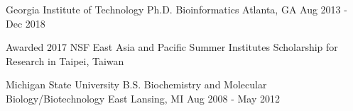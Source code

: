 \vspace{1.0mm}

\begin{cventries}

  \cventry
  	{Georgia Institute of Technology} %
    {Ph.D. Bioinformatics \scriptsize{}}%
    {Atlanta, GA} %
    {Aug 2013 - Dec 2018} %
    {\begin{cvitems}
    \item \scriptsize{Awarded 2017 NSF East Asia and Pacific Summer Institutes Scholarship for Research in Taipei, Taiwan}
    \end{cvitems}
    }


  \cventry
  	{Michigan State University} %
    {B.S. Biochemistry and Molecular Biology/Biotechnology \scriptsize{}} %
    {East Lansing, MI} %
    {Aug 2008 - May 2012} %
    {}
	
\vspace{-2em}

\end{cventries}
